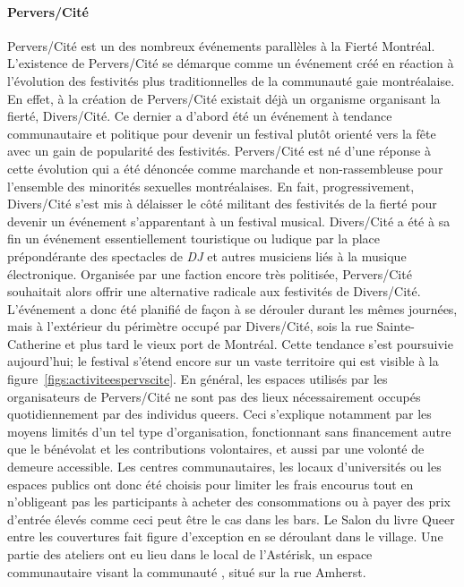 \paragraph{Pervers/Cité}
\label{subsec:perverscite}
Pervers/Cité est un des nombreux événements parallèles à la Fierté Montréal.
L'existence de Pervers/Cité se démarque comme un événement créé en réaction à l'évolution des festivités plus traditionnelles de la communauté gaie montréalaise.
En effet, à la création de Pervers/Cité existait déjà un organisme organisant la fierté, Divers/Cité.
Ce dernier a d'abord été un événement à tendance communautaire et politique pour devenir un festival plutôt orienté vers la fête avec un gain de popularité des festivités.
Pervers/Cité est né d'une réponse à cette évolution qui a été dénoncée comme marchande et non-rassembleuse pour l'ensemble des minorités sexuelles montréalaises.
En fait, progressivement, Divers/Cité s'est mis à délaisser le côté militant des festivités de la fierté pour  devenir un événement s'apparentant à un festival musical.
Divers/Cité a été à sa fin un événement essentiellement touristique ou ludique par la place prépondérante des spectacles de \emph{DJ} et autres musiciens liés à la musique électronique.
Organisée par une faction encore très politisée, Pervers/Cité souhaitait alors offrir une alternative radicale aux festivités de Divers/Cité.
L'événement a donc été planifié de façon à se dérouler durant les mêmes journées, mais à l'extérieur du périmètre occupé par Divers/Cité, sois la rue Sainte-Catherine et plus tard le vieux port de Montréal.
Cette tendance s'est poursuivie aujourd'hui; le festival s'étend encore sur un vaste territoire qui est visible à la figure~\ref{figs:activiteespervscite}.
En général, les espaces utilisés par les organisateurs de Pervers/Cité ne sont pas des lieux nécessairement occupés quotidiennement par des individus queers.
Ceci s'explique notamment par les moyens limités d'un tel type d'organisation, fonctionnant sans financement autre que le bénévolat et les contributions volontaires, et aussi par une volonté de demeure accessible.
Les centres communautaires, les locaux d'universités ou les espaces publics ont donc été choisis pour limiter les frais encourus tout en n’obligeant pas les participants à acheter des consommations ou à payer des prix d'entrée élevés comme ceci peut être le cas dans les bars.
Le Salon du livre Queer entre les couvertures fait figure d'exception en se déroulant dans le village.
Une partie des ateliers ont eu lieu dans le local de l'Astérisk, un espace communautaire visant la communauté \lgbt{}, situé sur la rue Amherst.


